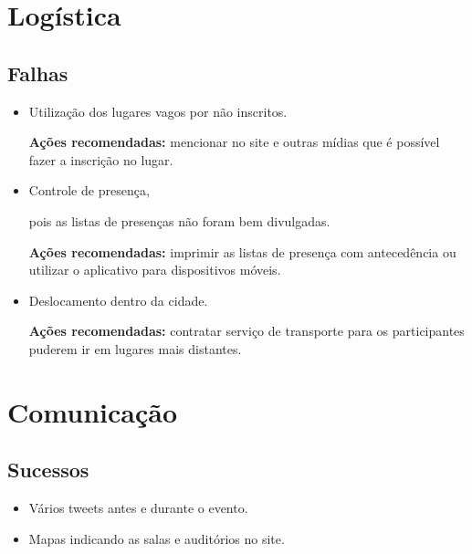 \documentclass[12pt]{article}
\begin{document}
\newpage

\section*{Logística}

%

\subsection*{Falhas}

\begin{itemize}
  \item Utilização dos lugares vagos por não inscritos.

    \textbf{Ações recomendadas:} mencionar no site e outras mídias que é
    possível fazer a inscrição no lugar.

  \item Controle de presença,

    pois as listas de presenças não foram bem divulgadas.

    \textbf{Ações recomendadas:} imprimir as listas de presença com antecedência
    ou utilizar o aplicativo para dispositivos móveis.

  \item Deslocamento dentro da cidade.

    \textbf{Ações recomendadas:} contratar serviço de transporte para os
    participantes puderem ir em lugares mais distantes.

\end{itemize}

\newpage

\section*{Comunicação}

\subsection*{Sucessos}

\begin{itemize}
  \item Vários tweets antes e durante o evento.

  \item Mapas indicando as salas e auditórios no site.
\end{itemize}
\end{document}
